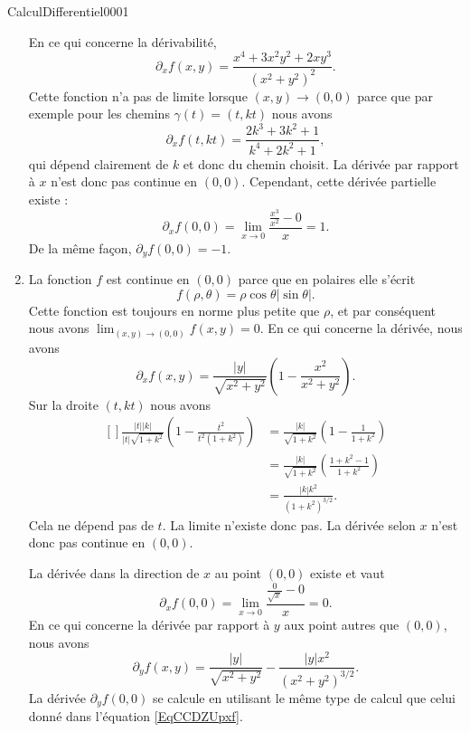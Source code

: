 \begin{corrige}{CalculDifferentiel0001}
\begin{enumerate}
			En ce qui concerne la dérivabilité,
			\begin{equation}
				\partial_xf(x,y)=\frac{ x^4+3x^2y^2+2xy^3 }{ (x^2+y^2)^2 }.
			\end{equation}
			Cette fonction n'a pas de limite lorsque $(x,y)\to(0,0)$ parce que par exemple pour les chemins $\gamma(t)=(t,kt)$ nous avons
			\begin{equation}
				\partial_xf(t,kt)=\frac{ 2k^3+3k^2+1 }{ k^4+2k^2+1 },
			\end{equation}
			qui dépend clairement de $k$ et donc du chemin choisit. La dérivée par rapport à $x$ n'est donc pas continue en $(0,0)$. Cependant, cette dérivée partielle existe :
			\begin{equation}	\label{EqcddzuiiDifcy}
				\partial_xf(0,0)=\lim_{x\to 0} \frac{ \frac{ x^3 }{ x^2 }-0 }{ x }=1.
			\end{equation}
			De la même façon, $\partial_yf(0,0)=-1$.

		\item
			La fonction $f$ est continue en $(0,0)$ parce que en polaires elle s'écrit
			\begin{equation}
				f(\rho,\theta)=\rho\cos\theta| \sin\theta |.
			\end{equation}
			Cette fonction est toujours en norme plus petite que $\rho$, et par conséquent nous avons $\lim_{(x,y)\to(0,0)}f(x,y)=0$. En ce qui concerne la dérivée, nous avons
			\begin{equation}
				\partial_xf(x,y)=\frac{ | y | }{ \sqrt{x^2+y^2} }\left( 1-\frac{ x^2 }{ x^2+y^2 } \right).
			\end{equation}
			Sur la droite $(t,kt)$ nous avons
			\begin{equation}
				\begin{aligned}[]
					\frac{ | t | |k | }{ | t |\sqrt{1+k^2} }\left( 1-\frac{ t^2 }{ t^2(1+k^2) } \right)&=\frac{ | k | }{ \sqrt{1+k^2} }\left( 1-\frac{1}{ 1+k^2 } \right)\\
					&=\frac{ | k | }{ \sqrt{1+k^2} }\left( \frac{ 1+k^2-1 }{ 1+k^2 } \right)\\
					&=\frac{ | k |k^2 }{ (1+k^2)^{3/2} }.
				\end{aligned}
			\end{equation}
			Cela ne dépend pas de $t$. La limite n'existe donc pas. La dérivée selon $x$ n'est donc pas continue en $(0,0)$.

			La dérivée dans la direction de $x$ au point $(0,0)$ existe et vaut
			\begin{equation}		\label{EqCCDZUpxf}
				\partial_xf(0,0)=\lim_{x\to 0} \frac{ \frac{ 0 }{ \sqrt{x} }-0 }{ x }=0.
			\end{equation}
			En ce qui concerne la dérivée par rapport à $y$ aux point autres que $(0,0)$, nous avons
			\begin{equation}
				\partial_yf(x,y)=\frac{ | y | }{ \sqrt{x^2+y^2} }-\frac{ | y |x^2 }{ (x^2+y^2)^{3/2} }.
			\end{equation}
			La dérivée $\partial_yf(0,0)$ se calcule en utilisant le même type de calcul que celui donné dans l'équation \eqref{EqCCDZUpxf}.


\end{enumerate}
\end{corrige}
